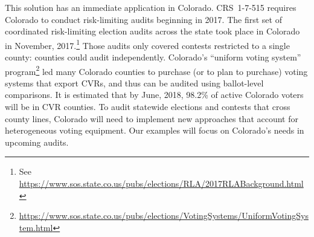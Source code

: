 \documentclass[runningheads]{llncs}
\begin{document}
This solution has an immediate application in Colorado.
CRS~1-7-515 requires Colorado to conduct risk-limiting audits beginning in 2017.
The first set of coordinated risk-limiting election audits across the state took place in Colorado in November, 2017.\footnote{%
 See \url{https://www.sos.state.co.us/pubs/elections/RLA/2017RLABackground.html}
}
Those audits only covered contests restricted to a single county:
counties could audit independently.
Colorado's ``uniform voting system'' program\footnote{%
  \url{https://www.sos.state.co.us/pubs/elections/VotingSystems/UniformVotingSystem.html}
} 
led many Colorado counties to purchase (or to plan to purchase) voting systems
that export CVRs, and thus can be audited using ballot-level comparisons.
It is estimated that by June, 2018, 98.2\% of active Colorado voters will be in CVR counties.
To audit statewide elections and contests that cross county lines, Colorado will need to implement new approaches
that account for heterogeneous voting equipment.
Our examples will focus on Colorado's needs in upcoming audits.



\end{document}
